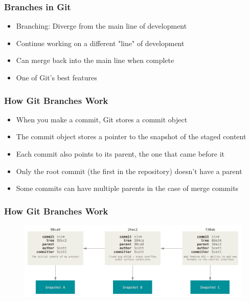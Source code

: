 \documentclass{beamer}
\begin{document}

\begin{frame}
	\frametitle{Branches in Git}
	\begin{itemize}
		\item{Branching: Diverge from the main line of development}
		\item{Continue working on a different "line" of development}
		\item{Can merge back into the main line when complete}
		\item{One of Git's best features}
	\end{itemize}
\end{frame}

\begin{frame}
	\frametitle{How Git Branches Work}
	\begin{itemize}
		\item{When you make a commit, Git stores a commit object}
		\item{The commit object stores a pointer to the snapshot of the staged content}
		\item{Each commit also points to its parent, the one that came before it}
		\item{Only the root commit (the first in the repository) doesn't have a parent}
		\item{Some commits can have multiple parents in the case of merge commits}
	\end{itemize}
\end{frame}

\begin{frame}
	\frametitle{How Git Branches Work}
	\begin{figure}
		\includegraphics[scale=0.40]{How_Git_Branches_Work-0.png}
	\end{figure}
\end{frame}
\end{document}
